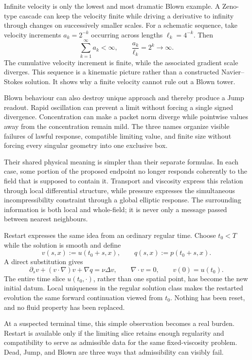 Infinite velocity is only the lowest and most dramatic Blown example.
A Zeno-type cascade can keep the velocity finite while driving a derivative to infinity through changes on successively smaller scales.
For a schematic sequence, take velocity increments \(a_k=2^{-k}\) occurring across lengths \(\ell_k=4^{-k}\).
Then
\[
  \sum_{k=1}^{\infty}a_k<\infty,
  \qquad
  \frac{a_k}{\ell_k}=2^k\longrightarrow\infty.
\]
The cumulative velocity increment is finite, while the associated gradient scale diverges.
This sequence is a kinematic picture rather than a constructed Navier--Stokes solution.
It shows why a finite velocity cannot rule out a Blown tower.

Blown behaviour can also destroy unique approach and thereby produce a Jump readout.
Rapid oscillation can prevent a limit without forcing a single signed divergence.
Concentration can make a packet norm diverge while pointwise values away from the concentration remain mild.
The three names organize visible failures of lawful response, compatible limiting value, and finite size without forcing every singular geometry into one exclusive box.

Their shared physical meaning is simpler than their separate formulas.
In each case, some portion of the proposed endpoint no longer responds coherently to the field that is supposed to contain it.
Transport and viscosity express this relation through local differential structure, while pressure expresses the simultaneous incompressibility constraint through a global elliptic response.
The surrounding information is both local and whole-field; it is never only a message passed between nearest neighbours.


Restart expresses the same idea from an ordinary regular time.
Choose \(t_0<T\) while the solution is smooth and define
\[
  v(s,x):=u(t_0+s,x),
  \qquad
  q(s,x):=p(t_0+s,x).
\]
A direct substitution gives
\[
  \partial_sv+(v\cdot\nabla)v+\nabla q
  =
  \nu\Delta v,
  \qquad
  \nabla\cdot v=0,
  \qquad
  v(0)=u(t_0).
\]
The entire time slice \(u(t_0,\cdot)\), rather than one spatial point, has become the new initial datum.
Local uniqueness in the regular solution class makes the restarted evolution the same forward continuation viewed from \(t_0\).
Nothing has been reset, and no fluid property has been replaced.

At a suspected terminal time, this simple observation becomes a real burden.
Restart is available only if the limiting slice retains enough regularity and compatibility to serve as admissible data for the same fixed-viscosity problem.
Dead, Jump, and Blown are three ways that admissibility can visibly fail.
